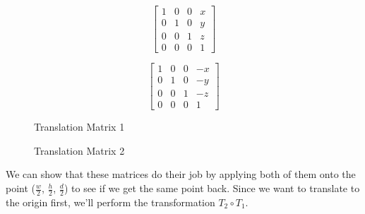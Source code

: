 \documentclass[14pt]{article}
\begin{document}
\begin{figure}[H]
	\begin{center}
		\begin{minipage}[b]{0.45\textwidth}
			\centering	
			$$
			\begin{bmatrix}
			1 & 0 & 0 & x \\
			0 & 1 & 0 & y \\ 
			0 & 0 & 1 & z \\
			0 & 0 & 0 & 1
			\end{bmatrix}			
			$$
		\end{minipage}
		\hfill
		\begin{minipage}[b]{0.45\textwidth}
			\centering
			$$
			\begin{bmatrix}
			1 & 0 & 0 & -x \\
			0 & 1 & 0 & -y \\ 
			0 & 0 & 1 & -z \\
			0 & 0 & 0 & 1
			\end{bmatrix}			
			$$
		\end{minipage}
	\end{center}
	\begin{center}
		\begin{minipage}[t]{0.45\textwidth}
			\caption*{Translation Matrix 1}
		\end{minipage}
		\hfill
		\begin{minipage}[t]{0.45\textwidth}
			\caption*{Translation Matrix 2}
		\end{minipage}
	\end{center}
\end{figure}

\vspace*{-7mm}

We can show that these matrices do their job by applying both of them onto the point ($\frac{w}{2}$, $\frac{h}{2}$, $\frac{d}{2}$) to see if we get the same point back. Since we want to translate to the origin first, we'll perform the transformation $T_2 \circ T_1$.
\end{document}
